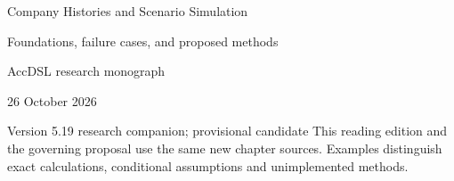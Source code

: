 \documentclass[11pt,a4paper]{report}
\begin{document}
\hypersetup{pageanchor=false}
\begin{titlepage}
{\Huge Company Histories and Scenario Simulation\par}
\vspace{12mm}
{\Large Foundations, failure cases, and proposed methods\par}
\vspace{8mm}
AccDSL research monograph\par 26 October 2026\par Version 5.19 research companion; provisional candidate
\vfill
This reading edition and the governing proposal use the same new chapter sources. Examples distinguish exact calculations, conditional assumptions and unimplemented methods.
\end{titlepage}
\hypersetup{pageanchor=true}
\tableofcontents
\clearpage{}


























\clearpage\label{sim:body-end}

\begingroup\raggedright
\endgroup
\end{document}

